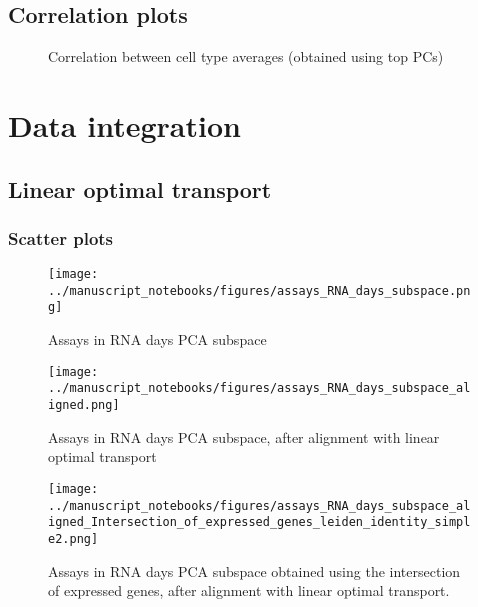 \documentclass[a4paper]{article}
\begin{document}
\FloatBarrier
\subsection{Correlation plots}

\begin{figure}[!htb]
  \centering
  \hspace{0mm}
  \caption{Correlation between cell type averages (obtained using top PCs)}
\end{figure}

\FloatBarrier
\section{Data integration}

\subsection{Linear optimal transport}

\subsubsection{Scatter plots}
\begin{figure}[!htb]
  \centering
  \texttt{[image: ../manuscript\_notebooks/figures/assays\_RNA\_days\_subspace.png]}
  \caption{Assays in RNA days PCA subspace}
\end{figure}

\begin{figure}[!htb]
  \centering
  \texttt{[image: ../manuscript\_notebooks/figures/assays\_RNA\_days\_subspace\_aligned.png]}
  \caption{Assays in RNA days PCA subspace, after alignment with linear optimal transport}
\end{figure}

\begin{figure}[!htb]
  \centering
  \texttt{[image: ../manuscript\_notebooks/figures/assays\_RNA\_days\_subspace\_aligned\_Intersection\_of\_expressed\_genes\_leiden\_identity\_simple2.png]}
  \caption{Assays in RNA days PCA subspace obtained using the intersection of expressed genes, after alignment with linear optimal transport.}
\end{figure}
\end{document}
